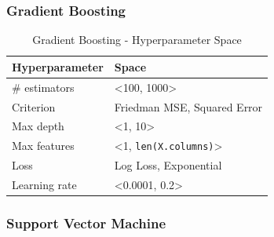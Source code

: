 \subsubsection{Gradient Boosting}

\begin{table}[H]
    \small
    \setlength{\tabcolsep}{8pt}
    \renewcommand{\arraystretch}{1.3}
    \centering
        \caption[Gradient Boosting - Hyperparameter Space]{Gradient Boosting - Hyperparameter Space}\label{tab:gbspace}
        \begin{tabular}{ll}
    \toprule
    \textbf{Hyperparameter} & \textbf{Space}\\
    \midrule
    \hline
    \# estimators & <100, 1000> \\
    Criterion & Friedman MSE, Squared Error \\
    Max depth & <1, 10> \\
    Max features & <1, \verb|len(X.columns)|>  \\
    Loss & Log Loss, Exponential \\
    Learning rate & <0.0001, 0.2> \\
    \hline
    \bottomrule
    \end{tabular}
    \vspace{0.7em}

    \vspace{-1em}
\end{table}

\subsubsection{Support Vector Machine}


